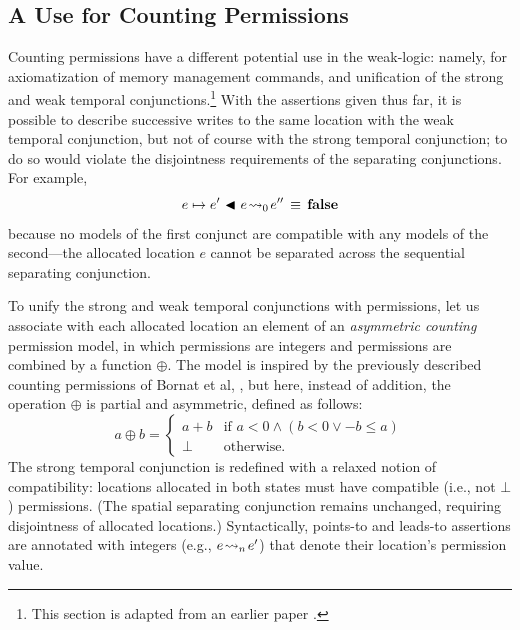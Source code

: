 \documentclass[11pt]{report}
\begin{document}
\subsection{A Use for Counting Permissions}


Counting permissions have a different potential use in the weak-logic: namely, for axiomatization of memory management commands, and unification of the strong and weak temporal conjunctions.\footnote{This section is adapted from an earlier paper \cite{lola11}.} With the assertions given thus far, it is possible to describe successive writes to the same location with the weak temporal conjunction, but not of course with the strong temporal conjunction; to do so would violate the disjointness requirements of the separating conjunctions. For example, \[ e \mapsto e' \operatorname{\,\blacktriangleleft\,} e \!\leadsto_{0}\! e'' \,\equiv\, \mathbf{false}\] because no models of the first conjunct are compatible with any models of the second---the allocated location $e$ cannot be separated across the sequential separating conjunction.

To unify the strong and weak temporal conjunctions with permissions, let us associate with each allocated location an element of an \emph{asymmetric counting} permission model, in which permissions are integers and permissions are combined by a function $\oplus$. The model is inspired by the previously described counting permissions of Bornat et al, \cite{DBLP:conf/popl/BornatCOP05}, but here, instead of addition, the operation $\oplus$ is partial and asymmetric, defined as follows: \[ a\oplus b = \begin{cases} a + b & \text{if $a < 0 \wedge (b < 0 \vee -b \leq a)$} \\ \bot & \text{otherwise.}\end{cases} \] The strong temporal conjunction is redefined with a relaxed notion of compatibility: locations allocated in both states must have compatible (i.e., not $\bot$) permissions. (The spatial separating conjunction remains unchanged, requiring disjointness of allocated locations.) Syntactically, points-to and leads-to assertions are annotated with integers (e.g., $e \!\leadsto_{n}\! e'$) that denote their location's permission value.
\end{document}

